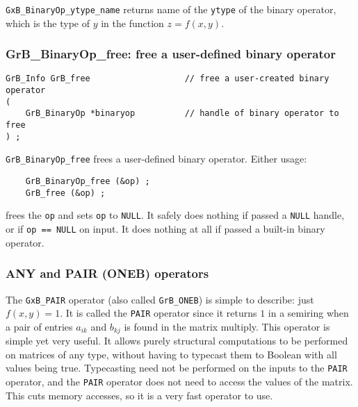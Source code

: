 \documentclass[12pt]{article}
\begin{document}
\verb'GxB_BinaryOp_ytype_name'
returns name of the \verb'ytype' of the binary operator, which is the
type of $y$ in the function $z=f(x,y)$.

\subsubsection{{\sf GrB\_BinaryOp\_free:} free a user-defined binary operator}
\label{binaryop_free}

\begin{mdframed}[userdefinedwidth=6in]
{\footnotesize
\begin{verbatim}
GrB_Info GrB_free                   // free a user-created binary operator
(
    GrB_BinaryOp *binaryop          // handle of binary operator to free
) ;
\end{verbatim}
} \end{mdframed}

\verb'GrB_BinaryOp_free' frees a user-defined binary operator.
Either usage:

    {\small
    \begin{verbatim}
    GrB_BinaryOp_free (&op) ;
    GrB_free (&op) ; \end{verbatim}}

\noindent
frees the \verb'op' and sets \verb'op' to \verb'NULL'.
It safely does nothing if passed a \verb'NULL'
handle, or if \verb'op == NULL' on input.
It does nothing at all if passed a built-in binary operator.

\subsubsection{{\sf ANY} and {\sf PAIR} ({\sf ONEB}) operators}
\label{any_pair}

The \verb'GxB_PAIR' operator (also called \verb'GrB_ONEB') is simple to describe:
just $f(x,y)=1$.  It is called
the \verb'PAIR' operator since it returns $1$ in a semiring when a pair of
entries $a_{ik}$ and $b_{kj}$ is found in the matrix multiply.  This operator
is simple yet very useful.  It allows purely structural computations to be
performed on matrices of any type, without having to typecast them to Boolean
with all values being true.  Typecasting need not be performed on the inputs to
the \verb'PAIR' operator, and the \verb'PAIR' operator does not need to access
the values of the matrix.  This cuts memory accesses, so it is a very fast
operator to use.
\end{document}
